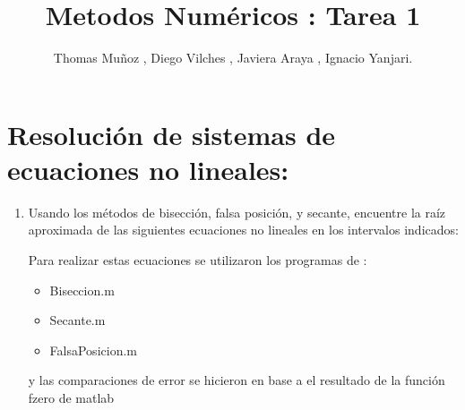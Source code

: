 \documentclass{udparticle}
\title{Metodos Numéricos : Tarea 1}
\author{Thomas Muñoz , Diego Vilches , Javiera Araya , Ignacio Yanjari.}
\begin{document}
\maketitle
\section{Resolución de sistemas de ecuaciones no lineales:}
\begin{enumerate}
\item Usando los métodos de bisección, falsa posición, y secante, encuentre la raíz aproximada 
de las siguientes ecuaciones no lineales en los intervalos indicados:

    \begin{enumerate}
        
    Para realizar estas ecuaciones se utilizaron los programas de :
    \begin{itemize}
        \item Biseccion.m
        \item Secante.m
        \item FalsaPosicion.m
    \end{itemize}
    y las comparaciones de error se hicieron en base a el resultado de la función fzero de matlab
    

\end{enumerate}
\end{enumerate}
\end{document}
